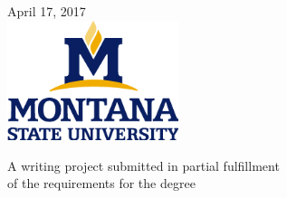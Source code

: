 \documentclass[12pt]{article}\usepackage[]{graphicx}\usepackage[]{color}
\begin{document}
\begin{titlepage}
{\large April 17, 2017}\\[2cm] %


\includegraphics[width=5cm]{MSU-vert.png} %
 

A writing project submitted in partial fulfillment\\
of the requirements for the degree\\[.25in]

\vfill %

\end{titlepage}
\end{document}
